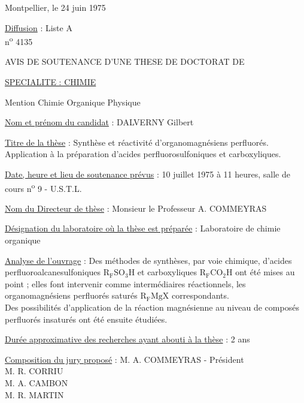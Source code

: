 Montpellier, le 24 juin 1975

\uline{Diffusion} : Liste A\\
n\textsuperscript{o} 4135

AVIS DE SOUTENANCE D'UNE THESE DE DOCTORAT DE

\uline{SPECIALITE : CHIMIE}

Mention Chimie Organique Physique

\uline{Nom et prénom du candidat} : DALVERNY Gilbert

\uline{Titre de la thèse} : Synthèse et réactivité d'organomagnésiens perfluorés.
Application à la préparation d'acides perfluorosulfoniques et carboxyliques.

\uline{Date, heure et lieu de soutenance prévus} : 10 juillet 1975 à 11 heures, salle
de cours n\textsuperscript{o} 9 - U.S.T.L.

\uline{Nom du Directeur de thèse} : Monsieur le Professeur A. COMMEYRAS

\uline{Désignation du laboratoire où la thèse est préparée} : Laboratoire de chimie organique

\uline{Analyse de l'ouvrage} : Des méthodes de synthèses, par voie chimique, d'acides
perfluoroalcanesulfoniques \(\mathrm{R_FSO_3H}\) et carboxyliques \(\mathrm{R_FCO_2H}\)
ont été mises au point ; elles font intervenir comme intermédiaires réactionnels, les
organomagnésiens perfluorés saturés \(\mathrm{R_FMgX}\) correspondants.\\
Des possibilités d'application de la réaction magnésienne au niveau de composés
perfluorés insaturés ont été ensuite étudiées.

\uline{Durée approximative des recherches ayant abouti à la thèse} : 2 ans

\uline{Composition du jury proposé} : M. A. COMMEYRAS - Président\\
M. R. CORRIU\\
M. A. CAMBON\\
M. R. MARTIN

